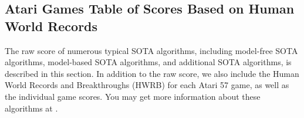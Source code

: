 


\clearpage

\subsection{Atari Games Table of Scores Based on Human World Records}
\label{app: Atari Games Table of Scores Based on Human World Records}

The raw score of numerous typical SOTA algorithms, including model-free SOTA algorithms, model-based SOTA algorithms, and additional SOTA algorithms, is described in this section. In addition to the raw score, we also include the Human World Records and Breakthroughs (HWRB) for each Atari 57 game, as well as the individual game scores. You may get more information about these algorithms at \cite{ale2,atarihuman}.

\clearpage


